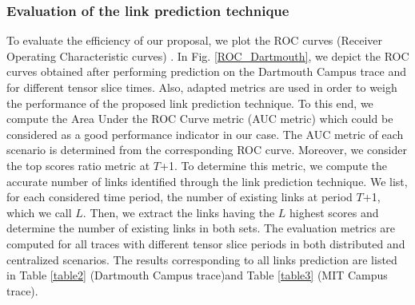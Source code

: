 \documentclass[conference]{IEEEtran}
\begin{document}
\subsubsection{Evaluation of the link prediction technique}
To evaluate the efficiency of our proposal, we plot the ROC curves
(Receiver Operating Characteristic curves) \cite{FAWCETT2006}. In
Fig. \ref{ROC_Dartmouth}, we depict the ROC curves obtained after
performing prediction on the Dartmouth Campus trace and for
different tensor slice times. Also, adapted metrics are used in
order to weigh the performance of the proposed link prediction
technique. To this end, we compute the Area Under the ROC Curve
metric (AUC metric) \cite{FAWCETT2006} which could be considered as
a good performance indicator in our case. The AUC metric of each
scenario is determined from the corresponding ROC curve. Moreover,
we consider the top scores ratio metric at $T$+1. To determine this
metric, we compute the accurate number of links identified through
the link prediction technique. We list, for each considered time
period, the number of existing links at period $T$+1, which we call
$L$. Then, we extract the links having the $L$ highest scores and
determine the number of existing links in both sets. The evaluation
metrics are computed for all traces with different tensor slice
periods in both distributed and centralized scenarios. The results
corresponding to all links prediction are listed in Table
\ref{table2} (Dartmouth Campus trace)and Table \ref{table3} (MIT
Campus trace).

\begin{figure*}[!tb]
  \centering
  \hspace{1cm}\\
 \hspace{1cm}
  \caption{ROC Curves for different prediction cases applied on Dartmouth Campus trace}
  \label{ROC_Dartmouth}
\end{figure*}
\end{document}
